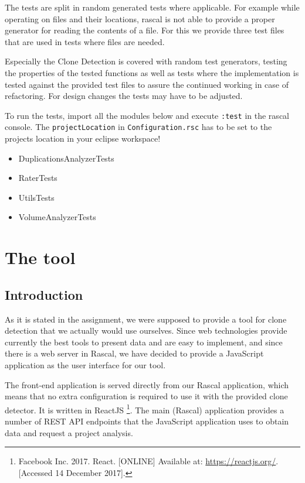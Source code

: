 \documentclass{uva-inf-article}
\begin{document}
The tests are split in random generated tests where applicable. For example while operating on files and their locations, rascal is not able to provide a proper generator for reading the contents of a file. For this we provide three test files that are used in tests where files are needed. 

Especially the Clone Detection is covered with random test generators, testing the properties of the tested functions as well as tests where the implementation is tested against the provided test files to assure the continued working in case of refactoring. For design changes the tests may have to be adjusted.

To run the tests, import all the modules below and execute \texttt{:test} in the rascal console. The \texttt{projectLocation} in \texttt{Configuration.rsc} has to be set to the projects location in your eclipse workspace!

\begin{itemize}

\item
  DuplicationsAnalyzerTests
\item
  RaterTests
\item
  UtilsTests
\item
  VolumeAnalyzerTests
\end{itemize}


\section{The tool}

\subsection{Introduction}
As it is stated in the assignment, we were supposed to provide a tool for clone detection that we actually would use ourselves.  Since web technologies provide currently the best tools to present data and are easy to implement, and since there is a web server in Rascal, we have decided to provide a JavaScript application as the user interface for our tool. 

The front-end application is served directly from our Rascal application, which means that no extra configuration is required to use it with the provided clone detector. It is written in ReactJS \footnote{Facebook Inc. 2017. React. [ONLINE] Available at: \url{https://reactjs.org/}. [Accessed 14 December 2017].
}. The main (Rascal) application provides a number of REST API endpoints that the JavaScript application uses to obtain data and request a project analysis. 
\end{document}
